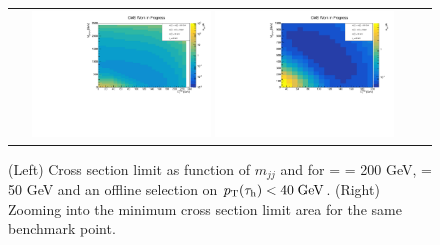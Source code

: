 \begin{figure}[tbh!]
	\centering
	\begin{tabular}{cc}
		\includegraphics[width=0.45\textwidth]{analysis/pics/JetInvMass_vs_MET_xsec_chi200_lsp050_taupt40.pdf}
		\includegraphics[width=0.45\textwidth]{analysis/pics/JetInvMass_vs_MET_xsec_chi200_lsp050_taupt40_zoom.pdf}
	\end{tabular}
	\caption{(Left) Cross section limit as function of $m_{jj}$ and \met for \charginopm = \neutralinotwo = 200 GeV, \neutralinoone = 50 GeV and an offline selection on $p_{\text{T}}(\tau_{\text{h}}) <  40\;\text{Ge}\kern-0.06667em\text{V}$. (Right) Zooming into the minimum cross section limit area for the same benchmark point.}
	\label{fig::JetInvMass_vs_MET_xsec_chi200_lsp050_taupt40}
\end{figure}

